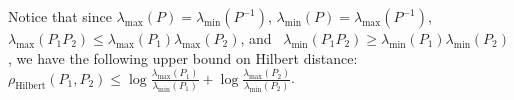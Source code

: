 \documentclass[entropy,article,accept,oneauthor,pdftex,entropy]{Definitions/mdpi}
\def\Hilbert{\mathrm{Hilbert}}
\begin{document}
Notice that since $\lambda_{\mathrm{max}}(P)=\lambda_{\mathrm{min}}(P^{-1})$,
$\lambda_{\mathrm{min}}(P)=\lambda_{\mathrm{max}}(P^{-1})$, \\
$\lambda_{\mathrm{max}}(P_1P_2)\leq \lambda_{\mathrm{max}}(P_1)\lambda_{\mathrm{max}}(P_2)$, and~
$\lambda_{\mathrm{min}}(P_1P_2)\geq \lambda_{\mathrm{min}}(P_1)\lambda_{\mathrm{min}}(P_2)$, we have the following upper bound on Hilbert distance: 
$\rho_\Hilbert(P_1,P_2)\leq \log\frac{\lambda_{\mathrm{max}}(P_1)}{\lambda_{\mathrm{min}}(P_1)}+
\log\frac{\lambda_{\mathrm{max}}(P_2)}{\lambda_{\mathrm{min}}(P_2)}$. 

\vspace{6pt} 




\end{document}
